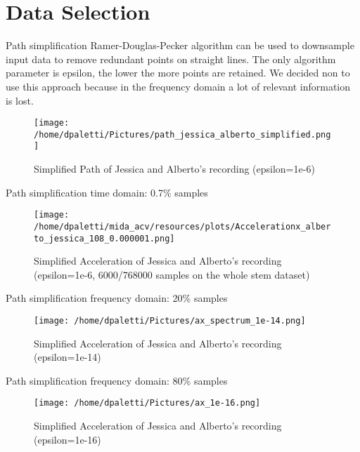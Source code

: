 \documentclass[presentation]{beamer}
\begin{document}
\section{Data Selection}
\label{sec:orgaf7c486}
\begin{frame}[label={sec:org4e7e77d}]{Path simplification}
\alert{Ramer-Douglas-Pecker} algorithm can be used to \alert{downsample} input data to remove redundant points on straight lines. \newline
The only algorithm parameter is \alert{epsilon}, the lower the more points are retained. \newline
We decided non to use this approach because in the \alert{frequency} domain a lot of relevant \alert{information is lost}.
\begin{figure}[htbp]
\centering
\texttt{[image: /home/dpaletti/Pictures/path\_jessica\_alberto\_simplified.png]}
\caption{\label{fig:speed_alberto_jessica}Simplified Path of Jessica and Alberto's recording (epsilon=1e-6)}
\end{figure}
\end{frame}
\begin{frame}[label={sec:orgf39a95e}]{Path simplification time domain: 0.7\% samples}
\begin{figure}[htbp]
\centering
\texttt{[image: /home/dpaletti/mida\_acv/resources/plots/Accelerationx\_alberto\_jessica\_108\_0.000001.png]}
\caption{Simplified Acceleration of Jessica and Alberto's recording (epsilon=1e-6, 6000/768000 samples on the whole stem dataset)}
\end{figure}
\end{frame}
\begin{frame}[label={sec:org4a62625}]{Path simplification frequency domain: 20\% samples}
\begin{figure}[htbp]
\centering
\texttt{[image: /home/dpaletti/Pictures/ax\_spectrum\_1e-14.png]}
\caption{Simplified Acceleration of Jessica and Alberto's recording (epsilon=1e-14)}
\end{figure}
\end{frame}
\begin{frame}[label={sec:orgf2f72eb}]{Path simplification frequency domain: 80\% samples}
\begin{figure}[htbp]
\centering
\texttt{[image: /home/dpaletti/Pictures/ax\_1e-16.png]}
\caption{Simplified Acceleration of Jessica and Alberto's recording (epsilon=1e-16)}
\end{figure}
\end{frame}
\end{document}
